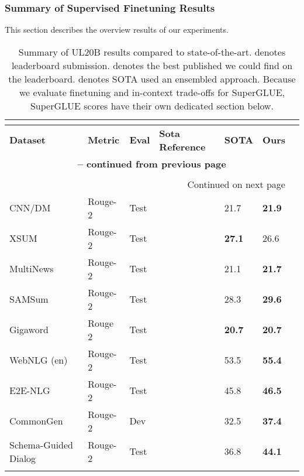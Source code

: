 \documentclass[10pt]{article}
\begin{document}
\subsubsection{Summary of Supervised Finetuning Results}
This section describes the overview results of our experiments.
\setlength{\LTcapwidth}{\linewidth}
\begin{center}
\small
\begin{longtable}{lllllll}


     \caption{Summary of UL20B results compared to state-of-the-art.  denotes leaderboard submission.  denotes the best published we could find on the leaderboard.  denotes SOTA used an ensembled approach. Because we evaluate finetuning and in-context trade-offs for SuperGLUE, SuperGLUE scores have their own dedicated section below.} \\
         \label{tab:big_table} \\
\toprule
    \textbf{Dataset}     & \textbf{Metric} & \textbf{Eval} & \textbf{Sota Reference}  &  \textbf{SOTA} & \textbf{Ours} \\
    \midrule
    \endfirsthead
    
    \multicolumn{6}{c}{{\bfseries \tablename\ \thetable{} -- continued from previous page}} \\
\midrule \\
\endhead

\midrule \multicolumn{6}{r}{{Continued on next page}} \\
\endfoot

\bottomrule
\endlastfoot

       CNN/DM  & Rouge-2    & Test & \citeauthor{zoph2022designing}  &   21.7 & \textbf{21.9}    \\
    XSUM  & Rouge-2 & Test & \citeauthor{zoph2022designing} &\textbf{27.1} & 26.6 \\ 
    MultiNews & Rouge-2 & Test & \citeauthor{xiao2021primer}&21.1 & \textbf{21.7} \\
    SAMSum & Rouge-2 & Test & \citeauthor{narayan-etal-2021-planning}& 28.3 & \textbf{29.6} \\
    Gigaword & Rouge 2 & Test & \citeauthor{aghajanyan2020better} & \textbf{20.7} & \textbf{20.7} \\
    WebNLG (en) & Rouge-2 & Test & \citeauthor{bakshi2021structure} & 53.5 & \textbf{55.4}  \\ 
    E2E-NLG & Rouge-2 & Test & \citeauthor{xue2020mt5} & 45.8 & \textbf{46.5}\\
   CommonGen & Rouge-2 & Dev & \citeauthor{gehrmann2021gem}  & 32.5 & \textbf{37.4}\\
   Schema-Guided Dialog & Rouge-2 & Test & \citeauthor{gehrmann2021gem} & 36.8 & \textbf{44.1}\\
   \\
   

\end{longtable}
\end{center}
\end{document}

